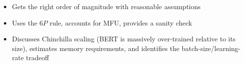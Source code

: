 \begin{interviewq}
\goodgreat
\begin{itemize}
    \item {} Gets the right order of magnitude with reasonable assumptions
    \item {} Uses the $6P$ rule, accounts for MFU, provides a sanity check
    \item {} Discusses Chinchilla scaling (BERT is massively over-trained relative to its size), estimates memory requirements, and identifies the batch-size/learning-rate tradeoff
\end{itemize}

\end{interviewq}

